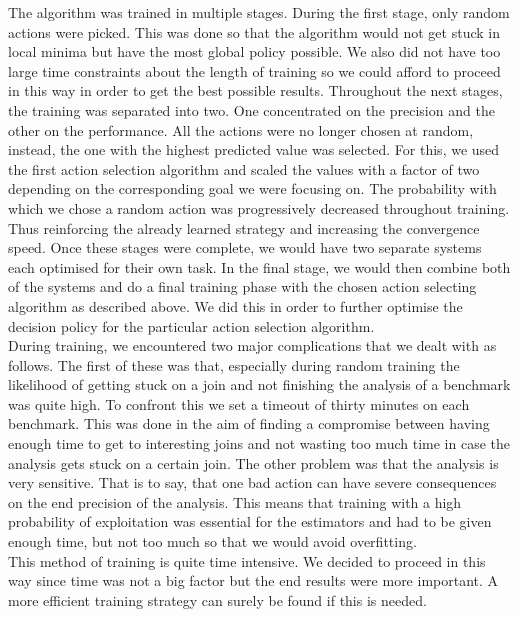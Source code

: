 The algorithm was trained in multiple stages. During the first stage, only random actions were picked. This was done so that the algorithm would not get stuck in local minima but have the most global policy possible. We also did not have too large time constraints about the length of training so we could afford to proceed in this way in order to get the best possible results. Throughout the next stages, the training was separated into two. One concentrated on the precision and the other on the performance. All the actions were no longer chosen at random, instead, the one with the highest predicted value was selected. For this, we used the first action selection algorithm and scaled the values with a factor of two depending on the corresponding goal we were focusing on. The probability with which we chose a random action was progressively decreased throughout training. Thus reinforcing the already learned strategy and increasing the convergence speed. Once these stages were complete, we would have two separate systems each optimised for their own task. In the final stage, we would then combine both of the systems and do a final training phase with the chosen action selecting algorithm as described above. We did this in order to further optimise the decision policy for the particular action selection algorithm.\\
During training, we encountered two major complications that we dealt with as follows. The first of these was that, especially during random training the likelihood of getting stuck on a join and not finishing the analysis of a benchmark was quite high. To confront this we set a timeout of thirty minutes on each benchmark. This was done in the aim of finding a compromise between having enough time to get to interesting joins and not wasting too much time in case the analysis gets stuck on a certain join. The other problem was that the analysis is very sensitive. That is to say, that one bad action can have severe consequences on the end precision of the analysis. This means that training with a high probability of exploitation was essential for the estimators and had to be given enough time, but not too much so that we would avoid overfitting.\\
This method of training is quite time intensive. We decided to proceed in this way since time was not a big factor but the end results were more important. A more efficient training strategy can surely be found if this is needed.



















